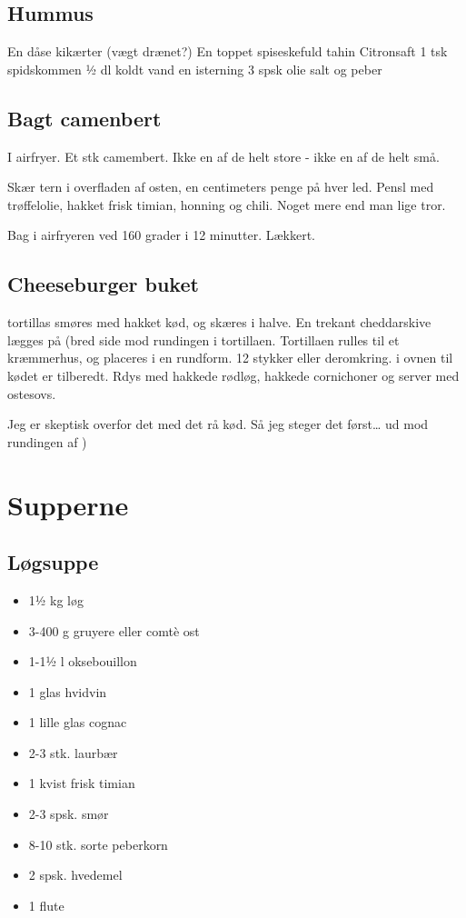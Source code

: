 \documentclass[
]{book}
\providecommand{\tightlist}{%
  \setlength{\itemsep}{0pt}\setlength{\parskip}{0pt}}
\begin{document}
\section{Hummus}\label{hummus}

En dåse kikærter (vægt drænet?)
En toppet spiseskefuld tahin
Citronsaft
1 tsk spidskommen
½ dl koldt vand
en isterning
3 spsk olie
salt og peber

\section{Bagt camenbert}\label{bagt-camenbert}

I airfryer. Et stk camembert. Ikke en af de helt store - ikke en af de helt små.

Skær tern i overfladen af osten, en centimeters penge på hver led.
Pensl med trøffelolie, hakket frisk timian, honning og chili. Noget mere end man
lige tror.

Bag i airfryeren ved 160 grader i 12 minutter. Lækkert.

\section{Cheeseburger buket}\label{cheeseburger-buket}

tortillas smøres med hakket kød, og skæres i halve.
En trekant cheddarskive lægges på (bred side mod rundingen i tortillaen.
Tortillaen rulles til et kræmmerhus, og placeres i en rundform. 12 stykker eller
deromkring. i ovnen til kødet er tilberedt. Rdys med hakkede rødløg, hakkede
cornichoner og server med ostesovs.

Jeg er skeptisk overfor det med det rå kød. Så jeg steger det først\ldots{}
ud mod rundingen af )

\chapter{Supperne}\label{supperne}

\section{Løgsuppe}\label{luxf8gsuppe}

\begin{itemize}
\tightlist
\item
  1½ kg løg
\item
  3-400 g gruyere eller comtè ost
\item
  1-1½ l oksebouillon
\item
  1 glas hvidvin
\item
  1 lille glas cognac
\item
  2-3 stk. laurbær
\item
  1 kvist frisk timian
\item
  2-3 spsk. smør
\item
  8-10 stk. sorte peberkorn
\item
  2 spsk. hvedemel
\item
  1 flute
\end{itemize}
\end{document}
